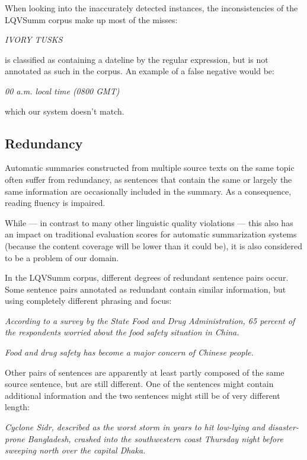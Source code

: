 \documentclass[a4paper,10pt]{scrartcl}
\theoremstyle{style}
\begin{document}

When looking into the inaccurately detected instances, the inconsistencies of the LQVSumm corpus make up most of the misses:

\textit{IVORY TUSKS}

is classified as containing a dateline by the regular expression, but is not annotated as such in the corpus. An example of a false negative would be:

\textit{00 a.m. local time (0800 GMT)}

which our system doesn't match.

\subsection{Redundancy}
\label{redundancy}

Automatic summaries constructed from multiple source texts on the same topic often suffer from redundancy, as sentences that contain the same or largely the same information are occasionally included in the summary. As a consequence, reading fluency is impaired.

While --- in contrast to many other linguistic quality violations --- this also has an impact on traditional evaluation scores for automatic summarization systems (because the content coverage will be lower than it could be), it is also considered to be a problem of our domain.

In the LQVSumm corpus, different degrees of redundant sentence pairs occur. Some sentence pairs annotated as redundant contain similar information, but using completely different phrasing and focus:

\textit{According to a survey by the State Food and Drug Administration, 65 percent of the respondents worried about the food safety situation in China.}

\textit{Food and drug safety has become a major concern of Chinese people.}

Other pairs of sentences are apparently at least partly composed of the same source sentence, but are still different. One of the sentences might contain additional information and the two sentences might still be of very different length:

\textit{Cyclone Sidr, described as the worst storm in years to hit low-lying and disaster-prone Bangladesh, crashed into the southwestern coast Thursday night before sweeping north over the capital Dhaka.}
\end{document}
